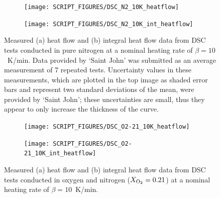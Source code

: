 \documentclass{book}
\begin{document}
\begin{figure} [p]
\centering
\begin{subfigure}[b]{0.85\textwidth}
   \texttt{[image: SCRIPT\_FIGURES/DSC\_N2\_10K\_heatflow]}
   \caption{}
   \label{Fig:DSC_N2_10K_heatflow}
\end{subfigure}

\begin{subfigure}[b]{0.85\textwidth}
   \texttt{[image: SCRIPT\_FIGURES/DSC\_N2\_10K\_int\_heatflow]}
   \caption{}
   \label{Fig:DSC_N2_10K_int_heatflow}
\end{subfigure}

  \caption{Measured (a) heat flow and (b) integral heat flow data from DSC tests conducted in pure nitrogen at a nominal heating rate of $\beta=10$~K/min. Data provided by `Saint John' was submitted as an average measurement of 7 repeated tests. Uncertainty values in these measurements, which are plotted in the top image as shaded error bars and represent two standard deviations of the mean, were provided by ‘Saint John’; these uncertainties are small, thus they appear to only increase the thickness of the curve.}
  \label{Fig:DSC_N2_10K}
\end{figure}


\begin{figure}[p]
\centering
\begin{subfigure}[b]{0.85\textwidth}
   \texttt{[image: SCRIPT\_FIGURES/DSC\_O2-21\_10K\_heatflow]}
   \caption{}
   \label{Fig:DSC_O2-21_10K_heatflow}
\end{subfigure}

\begin{subfigure}[b]{0.85\textwidth}
   \texttt{[image: SCRIPT\_FIGURES/DSC\_O2-21\_10K\_int\_heatflow]}
   \caption{}
   \label{Fig:DSC_O2-21_10K_int_heatflow}
\end{subfigure}

  \caption{Measured (a) heat flow and (b) integral heat flow data from DSC tests conducted in oxygen and nitrogen ($X_{\rm O_2}=0.21$) at a nominal heating rate of $\beta=10$~K/min.}
  \label{Fig:DSC_O2-21_10K}
\end{figure}
\end{document}
